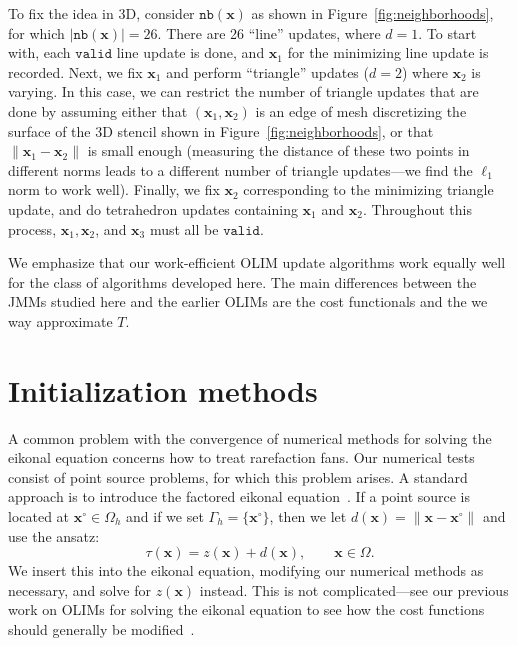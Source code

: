 \documentclass{siamart190516}
\newcommand{\m}[1]{\boldsymbol{#1}}
\newcommand{\nb}{\texttt{nb}}
\newcommand{\valid}{\texttt{valid}}
\begin{document}

To fix the idea in 3D, consider $\nb(\m{x})$ as shown in Figure\
\ref{fig:neighborhoods}, for which $|\nb(\m{x})| = 26$. There are 26
``line'' updates, where $d = 1$. To start with, each $\valid$ line
update is done, and $\m{x}_1$ for the minimizing line update is
recorded. Next, we fix $\m{x}_1$ and perform ``triangle'' updates
($d = 2$) where $\m{x}_2$ is varying. In this case, we can restrict
the number of triangle updates that are done by assuming either that
$(\m{x}_1, \m{x}_2)$ is an edge of mesh discretizing the surface of
the 3D stencil shown in Figure\ \ref{fig:neighborhoods}, or that
$\|\m{x}_1 - \m{x}_2\|$ is small enough (measuring the distance of
these two points in different norms leads to a different number of
triangle updates---we find the $\ell_1$ norm to work well). Finally,
we fix $\m{x}_2$ corresponding to the minimizing triangle update, and
do tetrahedron updates containing $\m{x}_1$ and $\m{x}_2$. Throughout
this process, $\m{x}_1, \m{x}_2$, and $\m{x}_3$ must all be $\valid$.

We emphasize that our work-efficient OLIM update algorithms work
equally well for the class of algorithms developed here. The main
differences between the JMMs studied here and the earlier OLIMs are
the cost functionals and the we way approximate $T$.

\section{Initialization methods}

A common problem with the convergence of numerical methods for solving
the eikonal equation concerns how to treat rarefaction fans. Our
numerical tests consist of point source problems, for which this
problem arises. A standard approach is to introduce the factored
eikonal equation~\cite{Fomel:2009aa}. If a point source is located at
$\m{x}^\circ \in \Omega_h$ and if we set $\Gamma_h = \{\m{x}^\circ\}$,
then we let $d(\m{x}) = \|\m{x} - \m{x}^\circ\|$ and use the ansatz:
\begin{equation}
  \tau(\m{x}) = z(\m{x}) + d(\m{x}), \qquad \m{x} \in \Omega.
\end{equation}
We insert this into the eikonal equation, modifying our numerical
methods as necessary, and solve for $z(\m{x})$ instead. This is not
complicated---see our previous work on OLIMs for solving the eikonal
equation to see how the cost functions should generally be
modified~\cite{Potter:2019ab,Yang:2019aa}.
\end{document}
